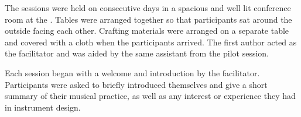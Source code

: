 \documentclass[letterpaper, 12pt]{article}
\begin{document}
The sessions were held on consecutive days in a spacious and well lit conference room at the . Tables were arranged together so that participants sat around the outside facing each other. Crafting materials were arranged on a separate table and covered with a cloth when the participants arrived. The first author acted as the facilitator and was aided by the same assistant from the pilot session. 



Each session began with a welcome and introduction by the facilitator. Participants were asked to briefly introduced themselves and give a short summary of their musical practice, as well as any interest or experience they had in instrument design. 


\end{document}
